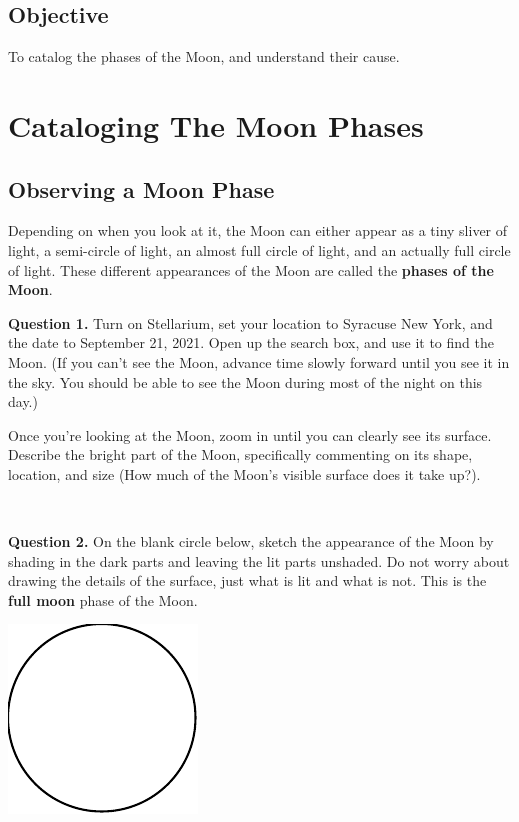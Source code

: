 \documentclass[11pt]{article}
\begin{document}
\subsection*{Objective}

To catalog the phases of the Moon, and understand their cause.

\newpage

\section{Cataloging The Moon Phases}

\subsection{Observing a Moon Phase}

Depending on when you look at it, the Moon can either appear as a tiny sliver of light, a semi-circle of light, an almost full circle of light, and an actually full circle of light. These different appearances of the Moon are called the \textbf{phases of the Moon}.

\noindent
\textbf{Question 1.} Turn on Stellarium, set your location to Syracuse New York, and the date to September 21, 2021. Open up the search box, and use it to find the Moon. (If you can't see the Moon, advance time slowly forward until you see it in the sky. You should be able to see the Moon during most of the night on this day.)

Once you're looking at the Moon, zoom in until you can clearly see its surface.\\

Describe the bright part of the Moon, specifically commenting on its shape, location, and size (How much of the Moon's visible surface does it take up?).\\
\vspace*{1.5cm}

\hrulefill\\
\noindent

\textbf{Question 2.} On the blank circle below, sketch the appearance of the Moon by shading in the dark parts and leaving the lit parts unshaded. Do not worry about drawing the details of the surface, just what is lit and what is not. This is the \textbf{full moon} phase of the Moon.\\
\begin{center}
	\includegraphics{blank_moon}
\end{center}
\end{document}
